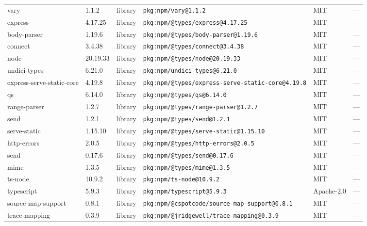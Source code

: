 \documentclass[11pt,a4paper]{article}
\begin{document}
\begin{longtable}{|p{4cm}|p{2cm}|p{1.6cm}|p{5cm}|p{1.5cm}|p{3.5cm}|}
\raggedright vary & 1.1.2 & library & \small\texttt{pkg:npm/vary@1.1.2} & MIT & \small — \\
\raggedright express & 4.17.25 & library & \small\texttt{pkg:npm/@types/express@4.17.25} & MIT & \small — \\
\raggedright body-parser & 1.19.6 & library & \small\texttt{pkg:npm/@types/body-parser@1.19.6} & MIT & \small — \\
\raggedright connect & 3.4.38 & library & \small\texttt{pkg:npm/@types/connect@3.4.38} & MIT & \small — \\
\raggedright node & 20.19.33 & library & \small\texttt{pkg:npm/@types/node@20.19.33} & MIT & \small — \\
\raggedright undici-types & 6.21.0 & library & \small\texttt{pkg:npm/undici-types@6.21.0} & MIT & \small — \\
\raggedright express-serve-static-core & 4.19.8 & library & \small\texttt{pkg:npm/@types/express-serve-static-core@4.19.8} & MIT & \small — \\
\raggedright qs & 6.14.0 & library & \small\texttt{pkg:npm/@types/qs@6.14.0} & MIT & \small — \\
\raggedright range-parser & 1.2.7 & library & \small\texttt{pkg:npm/@types/range-parser@1.2.7} & MIT & \small — \\
\raggedright send & 1.2.1 & library & \small\texttt{pkg:npm/@types/send@1.2.1} & MIT & \small — \\
\raggedright serve-static & 1.15.10 & library & \small\texttt{pkg:npm/@types/serve-static@1.15.10} & MIT & \small — \\
\raggedright http-errors & 2.0.5 & library & \small\texttt{pkg:npm/@types/http-errors@2.0.5} & MIT & \small — \\
\raggedright send & 0.17.6 & library & \small\texttt{pkg:npm/@types/send@0.17.6} & MIT & \small — \\
\raggedright mime & 1.3.5 & library & \small\texttt{pkg:npm/@types/mime@1.3.5} & MIT & \small — \\
\raggedright ts-node & 10.9.2 & library & \small\texttt{pkg:npm/ts-node@10.9.2} & MIT & \small — \\
\raggedright typescript & 5.9.3 & library & \small\texttt{pkg:npm/typescript@5.9.3} & Apache-2.0 & \small — \\
\raggedright source-map-support & 0.8.1 & library & \small\texttt{pkg:npm/@cspotcode/source-map-support@0.8.1} & MIT & \small — \\
\raggedright trace-mapping & 0.3.9 & library & \small\texttt{pkg:npm/@jridgewell/trace-mapping@0.3.9} & MIT & \small — \\

\end{longtable}
\end{document}
